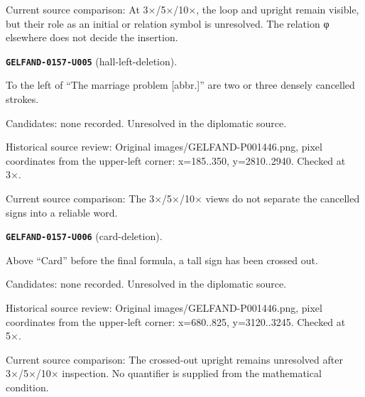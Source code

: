 Current source comparison: At 3×/5×/10×, the loop and upright remain visible, but their role as an initial or relation symbol is unresolved. The relation φ elsewhere does not decide the insertion.\par\medskip
\par\noindent\leavevmode{}\label{GELFAND-0157-U005}\label{GELFAND-P001446:hall-left-deletion}\textbf{\texttt{GELFAND-0157-U005}} (hall-left-deletion).\nopagebreak[4]\par
To the left of “The marriage problem [abbr.]” are two or three densely cancelled strokes.\par
Candidates: none recorded. Unresolved in the diplomatic source.\par
Historical source review: Original images/GELFAND-P001446.png, pixel coordinates from the upper-left corner: x=185..350, y=2810..2940. Checked at 3×.\par
Current source comparison: The 3×/5×/10× views do not separate the cancelled signs into a reliable word.\par\medskip
\par\noindent\leavevmode{}\label{GELFAND-0157-U006}\label{GELFAND-P001446:card-deletion}\textbf{\texttt{GELFAND-0157-U006}} (card-deletion).\nopagebreak[4]\par
Above “Card” before the final formula, a tall sign has been crossed out.\par
Candidates: none recorded. Unresolved in the diplomatic source.\par
Historical source review: Original images/GELFAND-P001446.png, pixel coordinates from the upper-left corner: x=680..825, y=3120..3245. Checked at 5×.\par
Current source comparison: The crossed-out upright remains unresolved after 3×/5×/10× inspection. No quantifier is supplied from the mathematical condition.\par\medskip
